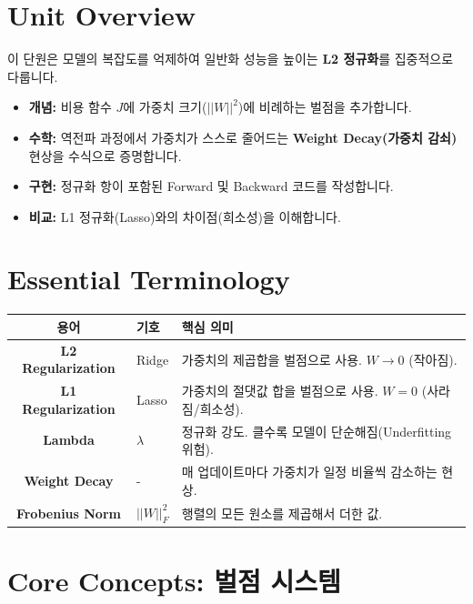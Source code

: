 \documentclass[11pt,a4paper]{book}
\theoremstyle{definition}
\begin{document}
\section{Unit Overview}
\begin{summarybox}[title={핵심 목표}]
이 단원은 모델의 복잡도를 억제하여 일반화 성능을 높이는 \textbf{L2 정규화}를 집중적으로 다룹니다.
\begin{itemize}
    \item \textbf{개념:} 비용 함수 $J$에 가중치 크기($||W||^2$)에 비례하는 벌점을 추가합니다.
    \item \textbf{수학:} 역전파 과정에서 가중치가 스스로 줄어드는 \textbf{Weight Decay(가중치 감쇠)} 현상을 수식으로 증명합니다.
    \item \textbf{구현:} 정규화 항이 포함된 Forward 및 Backward 코드를 작성합니다.
    \item \textbf{비교:} L1 정규화(Lasso)와의 차이점(희소성)을 이해합니다.
  \end{itemize}
\end{summarybox}

\section{Essential Terminology}
\begin{center}
\begin{tabular}{|c|l|l|}
\hline
\textbf{용어} & \textbf{기호} & \textbf{핵심 의미} \\ \hline
\textbf{L2 Regularization} & Ridge & 가중치의 제곱합을 벌점으로 사용. $W \to 0$ (작아짐). \\ \hline
\textbf{L1 Regularization} & Lasso & 가중치의 절댓값 합을 벌점으로 사용. $W = 0$ (사라짐/희소성). \\ \hline
\textbf{Lambda} & $\lambda$ & 정규화 강도. 클수록 모델이 단순해짐(Underfitting 위험). \\ \hline
\textbf{Weight Decay} & - & 매 업데이트마다 가중치가 일정 비율씩 감소하는 현상. \\ \hline
\textbf{Frobenius Norm} & $||W||_F^2$ & 행렬의 모든 원소를 제곱해서 더한 값. \\ \hline
\end{tabular}
\end{center}

\section{Core Concepts: 벌점 시스템}
\end{document}
